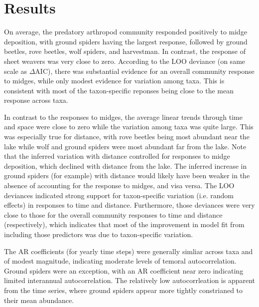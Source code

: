

\section*{Results}

On average, the predatory arthropod community responded positively to midge deposition,
with ground spiders having the largest response,
followed by ground beetles, rove beetles, wolf spiders, and harvestman.
In contrast, the response of sheet weavers was very close to zero.
According to the LOO deviance (on same scale as $\Delta$AIC),
there was substantial evidence for an overall community response to midges,
while only modest evidence for variation among taxa. This is consistent with
most of the taxon-specific reponses being close to the mean response across taxa.

In contrast to the responses to midges, the average linear trends through
time and space were close to zero while the variation among taxa was quite large.
This was especially true for distance, with rove beetles being most abundant near
the lake while wolf and ground spiders were most abundant far from the lake.
Note that the inferred variation with distance controlled for responses to midge
deposition, which declined with distance from the lake.
The inferred increase in ground spiders (for example) with distance
would likely have been weaker in the absence of accounting for the response to midges,
and visa versa.
The LOO deviances indicated strong support for taxon-specific variation
(i.e. random effects) in responses to time and distance.
Furthermore, those deviances were very close to those for the overall community
responses to time and distance (respectively), which indicates that most of the
improvement in model fit from including those predictors was due to taxon-specific
variation.

The AR coefficients (for yearly time steps) were generally simliar across taxa
and of modest magnitude, indicating moderate levels of temoral autocorrelation.
Ground spiders were an exception,
with an AR coefficient near zero indicating limited interannual autocorrelation.
The relatively low autocorrleation is apparent from the time series,
where ground spiders appear more tightly constrianed to their mean abundance.

